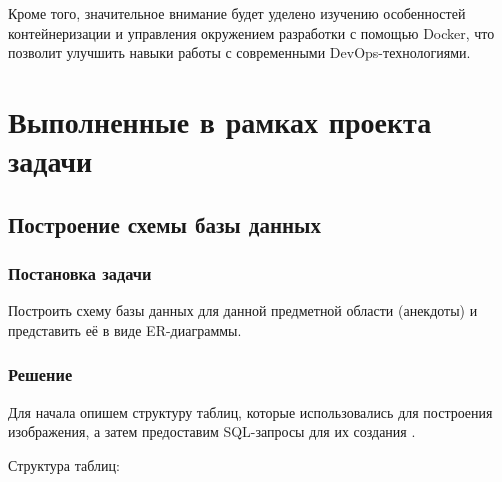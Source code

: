 \documentclass[pract]{SCWorks}
\begin{document}
Кроме того, значительное внимание будет уделено изучению особенностей
контейнеризации и управления окружением разработки с помощью Docker,
что позволит улучшить навыки работы с современными DevOps-технологиями.

\section{Выполненные в рамках проекта задачи}

\subsection{Построение схемы базы данных}

\subsubsection{Постановка задачи}

Построить схему базы данных для данной предметной области (анекдоты) и 
представить её в виде ER-диаграммы.

\subsubsection{Решение}

Для начала опишем структуру таблиц, которые использовались для построения
изображения, а затем предоставим SQL-запросы для их создания \cite{postgresql}.

Структура таблиц:
\end{document}
